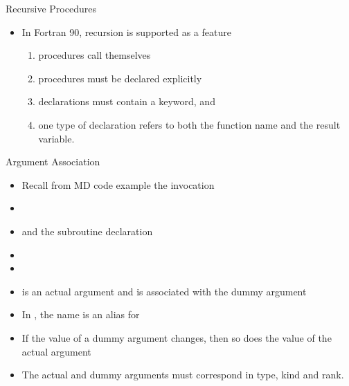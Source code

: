 \documentclass[10pt,t]{beamer}
\begin{document}
\begin{frame}[fragile]{Recursive Procedures}
  \begin{itemize}
    \item In Fortran 90, recursion is supported as a feature
    \begin{enumerate}
      \item {} procedures call themselves
      \item {} procedures must be declared explicitly
      \item {} declarations must contain a  keyword, and 
      \item one type of declaration refers to both the function name and the result variable.
    \end{enumerate}
  \end{itemize}    
  \begin{columns}[t]
    \column{6cm}
      Fortran},basicstyle=\fontsize{4.5}{5}\selectfont\ttfamily]{./Exercise/factorial.f90}
    \column{5cm}
      \begin{Verbatim}[fontsize=\fontsize{4.5}{5}\selectfont,formatcom=\color{indigo}]
[apacheco@qb4 Exercise] ./factorial
 enter integer whose factorial you want to calculate
10 
   10! =              3628800
[apacheco@qb4 Exercise] ./fact1
 Enter an integer < 15
10
  10!=        3628800
        \end{Verbatim}
    \end{columns}
\end{frame}

\begin{frame}[fragile]{Argument Association}
  \begin{itemize}
    \item Recall from MD code example the invocation
    \item[] 
    \item and the subroutine declaration
    \item[] 
    \item[]
    \item {} is an actual argument and is associated with the dummy argument {}
    \item In {}, the name {} is an alias for {}
    \item If the value of a dummy argument changes, then so does the value of the actual argument
    \item {\color{red}The actual and dummy arguments must correspond in type, kind and rank.}
  \end{itemize}
\end{frame}
\end{document}
